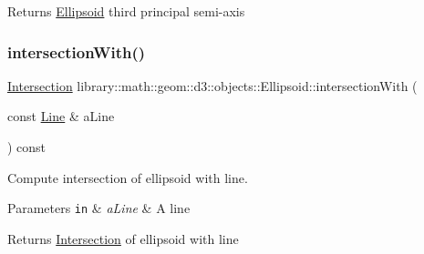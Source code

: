 \begin{DoxyReturn}{Returns}
\hyperlink{classlibrary_1_1math_1_1geom_1_1d3_1_1objects_1_1_ellipsoid}{Ellipsoid} third principal semi-\/axis 
\end{DoxyReturn}
\mbox{\label{classlibrary_1_1math_1_1geom_1_1d3_1_1objects_1_1_ellipsoid_a5a043a5a0ad0c68771902824c9ea0190}} 
\subsubsection{\texorpdfstring{intersection\+With()}{intersectionWith()}\hspace{0.1cm}{\footnotesize\ttfamily [1/5]}}
{\footnotesize\ttfamily \hyperlink{classlibrary_1_1math_1_1geom_1_1d3_1_1_intersection}{Intersection} library\+::math\+::geom\+::d3\+::objects\+::\+Ellipsoid\+::intersection\+With (\begin{DoxyParamCaption}\item[{const \hyperlink{classlibrary_1_1math_1_1geom_1_1d3_1_1objects_1_1_line}{Line} \&}]{a\+Line }\end{DoxyParamCaption}) const}



Compute intersection of ellipsoid with line. 


\begin{DoxyParams}[1]{Parameters}
\mbox{\tt in}  & {\em a\+Line} & A line \\
\hline
\end{DoxyParams}
\begin{DoxyReturn}{Returns}
\hyperlink{classlibrary_1_1math_1_1geom_1_1d3_1_1_intersection}{Intersection} of ellipsoid with line 
\end{DoxyReturn}
\mbox{\label{classlibrary_1_1math_1_1geom_1_1d3_1_1objects_1_1_ellipsoid_a2a7c282ac6d4b54210582953e37c8ab5}} 
